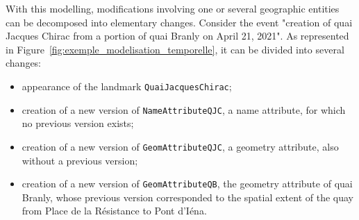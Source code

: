 With this modelling, modifications involving one or several geographic entities can be decomposed into elementary changes.
Consider the event "creation of quai Jacques Chirac from a portion of quai Branly on April 21, 2021".
As represented in Figure~\ref{fig:exemple_modelisation_temporelle}, it can be divided into several changes:

\begin{itemize}
    \item appearance of the landmark \texttt{QuaiJacquesChirac};
    \item creation of a new version of \texttt{NameAttributeQJC}, a name attribute, for which no previous version exists;
    \item creation of a new version of \texttt{GeomAttributeQJC}, a geometry attribute, also without a previous version;
    \item creation of a new version of \texttt{GeomAttributeQB}, the geometry attribute of quai Branly, whose previous version corresponded to the spatial extent of the quay from Place de la Résistance to Pont d'Iéna.
\end{itemize}